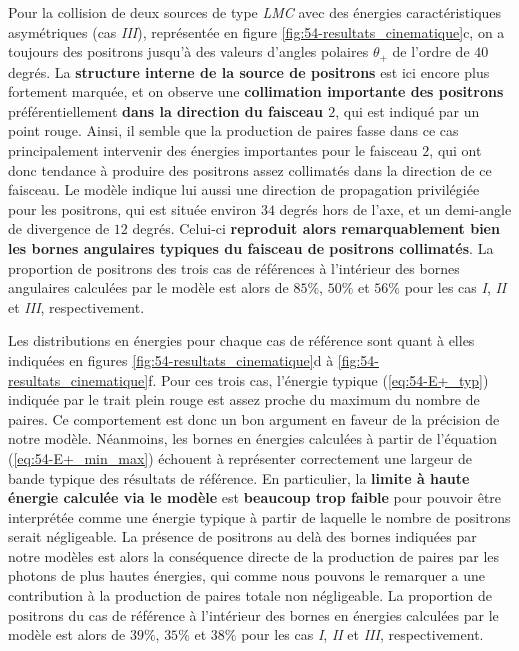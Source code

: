 \begin{refsection}
Pour la collision de deux sources de type \textit{LMC} avec des énergies caractéristiques asymétriques (cas \textit{III}), représentée en figure \ref{fig:54-resultats_cinematique}c, on a toujours des positrons jusqu'à des valeurs d'angles polaires $\theta_+$ de l'ordre de $40$ degrés. La \textbf{structure interne de la source de positrons} est ici encore plus fortement marquée, et on observe une \textbf{collimation importante des positrons} préférentiellement \textbf{dans la direction du faisceau $2$}, qui est indiqué par un point rouge. Ainsi, il semble que la production de paires fasse dans ce cas principalement intervenir des énergies importantes pour le faisceau $2$, qui ont donc tendance à produire des positrons assez collimatés dans la direction de ce faisceau. Le modèle indique lui aussi une direction de propagation privilégiée pour les positrons, qui est située environ $34$ degrés hors de l'axe, et un demi-angle de divergence de $12$ degrés. Celui-ci \textbf{reproduit alors remarquablement bien les bornes angulaires typiques du faisceau de positrons collimatés}. La proportion de positrons des trois cas de références à l'intérieur des bornes angulaires calculées par le modèle est alors de $85\%$, $50\%$ et $56\%$ pour les cas \textit{I}, \textit{II} et \textit{III}, respectivement.

Les distributions en énergies pour chaque cas de référence sont quant à elles indiquées en figures \ref{fig:54-resultats_cinematique}d à \ref{fig:54-resultats_cinematique}f. Pour ces trois cas, l'énergie typique (\ref{eq:54-E+_typ}) indiquée par le trait plein rouge est assez proche du maximum du nombre de paires. Ce comportement est donc un bon argument en faveur de la précision de notre modèle. Néanmoins, les bornes en énergies calculées à partir de l'équation (\ref{eq:54-E+_min_max}) échouent à représenter correctement une largeur de bande typique des résultats de référence. En particulier, la \textbf{limite à haute énergie calculée via le modèle} est \textbf{beaucoup trop faible} pour pouvoir être interprétée comme une énergie typique à partir de laquelle le nombre de positrons serait négligeable. La présence de positrons au delà des bornes indiquées par notre modèles est alors la conséquence directe de la production de paires par les photons de plus hautes énergies, qui comme nous pouvons le remarquer a une contribution à la production de paires totale non négligeable. La proportion de positrons du cas de référence à l'intérieur des bornes en énergies calculées par le modèle est alors de $39\%$, $35\%$ et $38\%$ pour les cas \textit{I}, \textit{II} et \textit{III}, respectivement.


\end{refsection}
